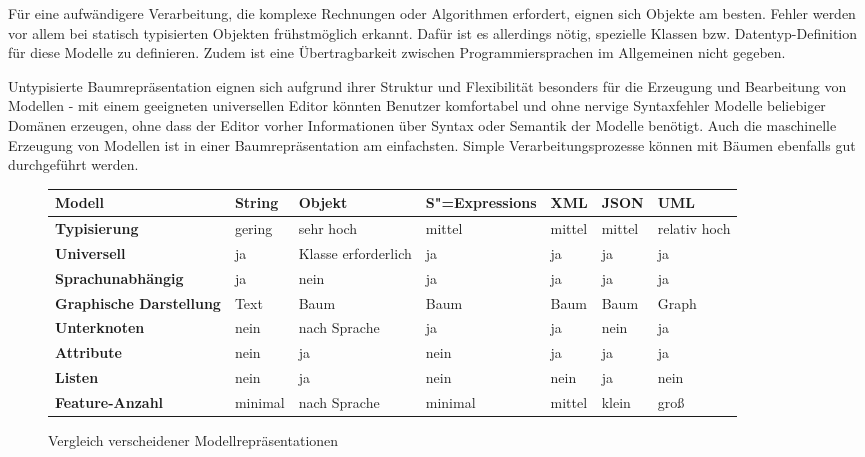 \documentclass[11pt, a4paper, bibgerm]{scrbook}
\newcommand{\sexps}{S"=Expressions}
\begin{document}
Für eine aufwändigere Verarbeitung, die komplexe Rechnungen oder
Algorithmen erfordert, eignen sich Objekte am besten. Fehler werden vor
allem bei statisch typisierten Objekten frühstmöglich erkannt. Dafür ist
es allerdings nötig, spezielle Klassen bzw. Datentyp-Definition für
diese Modelle zu definieren. Zudem ist eine Übertragbarkeit zwischen
Programmiersprachen im Allgemeinen nicht gegeben.

Untypisierte Baumrepräsentation eignen sich aufgrund ihrer Struktur und
Flexibilität besonders für die Erzeugung und Bearbeitung von Modellen -
mit einem geeigneten universellen Editor könnten Benutzer komfortabel
und ohne nervige Syntaxfehler Modelle beliebiger Domänen erzeugen, ohne
dass der Editor vorher Informationen über Syntax oder Semantik der
Modelle benötigt. Auch die maschinelle Erzeugung von Modellen ist in
einer Baumrepräsentation am einfachsten. Simple Verarbeitungsprozesse
können mit Bäumen ebenfalls gut durchgeführt werden.

\begin{figure}
  \centering
\begin{tabular}{|l|l|l|l|l|l|l|}\hline
\bf Modell                 & \bf String & \bf Objekt           & \bf \sexps{} & \bf XML & \bf JSON & \bf UML         \\\hline\hline
\bf Typisierung            & gering     & sehr hoch            & mittel       & mittel  & mittel   & relativ hoch    \\\hline
\bf Universell             & ja         & Klasse erforderlich  & ja           & ja      & ja       & ja              \\\hline
\bf Sprachunabhängig       & ja         & nein                 & ja           & ja      & ja       & ja              \\\hline
\bf Graphische Darstellung & Text       & Baum                 & Baum         & Baum    & Baum     & Graph           \\\hline
\bf Unterknoten            & nein       & nach Sprache         & ja           & ja      & nein     & ja              \\\hline
\bf Attribute              & nein       & ja                   & nein         & ja      & ja       & ja              \\\hline
\bf Listen                 & nein       & ja                   & nein         & nein    & ja       & nein            \\\hline
\bf Feature-Anzahl         & minimal    & nach Sprache         & minimal      & mittel  & klein    & groß            \\\hline
\end{tabular}
  \caption{Vergleich verscheidener Modellrepräsentationen}
  \label{magicl:fig:model_sum}
\end{figure}
\end{document}
